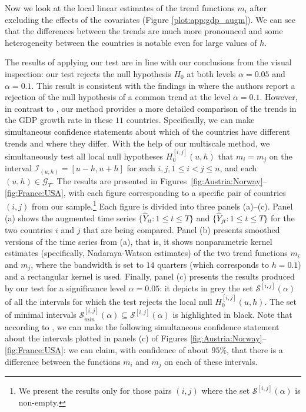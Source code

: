 \documentclass[a4paper,12pt]{article}
\makeatletter
\renewcommand{\eqref}[1]{\tagform@{\ref{#1}}}
\makeatother
\begin{document}
Now we look at the local linear estimates of the trend functions $m_i$ after excluding the effects of the covariates (Figure \ref{plot:app:gdp_augm}). We can see that the differences between the trends are much more pronounced and some heterogeneity between the countries is notable even for large values of $h$.

The results of applying our test are in line with our conclusions from the visual inspection: our test rejects the null hypothesis $H_0$ at both levels $\alpha =0.05$ and $\alpha = 0.1$. This result is consistent with the findings in \cite{Zhang2012} where the authors report a rejection of the null hypothesis of a common trend at the level $\alpha = 0.1$. However, in contrast to \cite{Zhang2012}, our method provides a more detailed comparison of the trends in the GDP growth rate in these $11$ countries. Specifically, we can make simultaneous confidence statements about which of the countries have different trends and where they differ. With the help of our multiscale method, we simultaneously test all local null hypotheses $H_0^{[i,j]}(u, h)$ that $m_i = m_j$ on the interval $\mathcal{I}_{(u, h)} = [u-h, u+h]$ for each $i, j, 1 \le i < j \le n$, and each $(u, h) \in \mathcal{G}_T$. The results are presented in Figures~\ref{fig:Austria:Norway}--\ref{fig:France:USA}, with each figure corresponding to a specific pair of countries $(i,j)$ from our sample.\footnote{We present the results only for those pairs $(i, j)$ where the set $\mathcal{S}^{[i, j]}(\alpha)$ is non-empty.} Each figure is divided into three panels (a)--(c).  Panel (a) shows the augmented time series $\{\widehat{Y}_{it}: 1 \le t \le T\}$ and $\{\widehat{Y}_{jt}: 1 \le t \le T\}$ for the two countries $i$ and $j$ that are being compared. Panel (b) presents smoothed versions of the time series from (a), that is, it shows nonparametric kernel estimates (specifically, Nadaraya-Watson estimates) of the two trend functions $m_i$ and $m_j$, where the bandwidth is set to $14$ quarters (which corresponds to $h = 0.1$) and a rectangular kernel is used. Finally, panel (c) presents the results produced by our test for a significance level $\alpha = 0.05$: it depicts in grey the set $\mathcal{S}^{[i,j]}(\alpha)$ of all the intervals for which the test rejects the local null $H_0^{[i, j]}(u, h)$. The set of minimal intervals $\mathcal{S}^{[i,j]}_{min}(\alpha) \subseteq \mathcal{S}^{[i,j]}(\alpha)$ is highlighted in black. Note that according to \eqref{corollary1}, we can make the following simultaneous confidence statement about the intervals plotted in panels (c) of Figures \ref{fig:Austria:Norway}--\ref{fig:France:USA}: we can claim, with confidence of about $95\%$, that there is a difference between the functions $m_i$ and $m_j$ on each of these intervals. 
\end{document}
